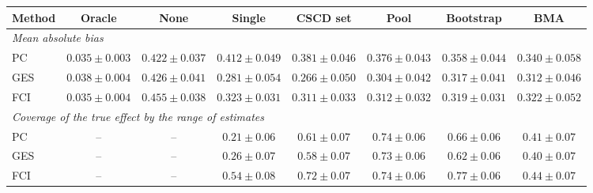 \begin{tabular}{lccccccc}
\toprule
Method & Oracle & None & Single & CSCD set & Pool & Bootstrap & BMA \\
\midrule
\multicolumn{8}{l}{\emph{Mean absolute bias}} \\
PC & $0.035\pm0.003$ & $0.422\pm0.037$ & $0.412\pm0.049$ & $0.381\pm0.046$ & $0.376\pm0.043$ & $0.358\pm0.044$ & $0.340\pm0.058$ \\
GES & $0.038\pm0.004$ & $0.426\pm0.041$ & $0.281\pm0.054$ & $0.266\pm0.050$ & $0.304\pm0.042$ & $0.317\pm0.041$ & $0.312\pm0.046$ \\
FCI & $0.035\pm0.004$ & $0.455\pm0.038$ & $0.323\pm0.031$ & $0.311\pm0.033$ & $0.312\pm0.032$ & $0.319\pm0.031$ & $0.322\pm0.052$ \\
\midrule
\multicolumn{8}{l}{\emph{Coverage of the true effect by the range of estimates}} \\
PC & -- & -- & $0.21\pm0.06$ & $0.61\pm0.07$ & $0.74\pm0.06$ & $0.66\pm0.06$ & $0.41\pm0.07$ \\
GES & -- & -- & $0.26\pm0.07$ & $0.58\pm0.07$ & $0.73\pm0.06$ & $0.62\pm0.06$ & $0.40\pm0.07$ \\
FCI & -- & -- & $0.54\pm0.08$ & $0.72\pm0.07$ & $0.74\pm0.06$ & $0.77\pm0.06$ & $0.44\pm0.07$ \\
\bottomrule
\end{tabular}

